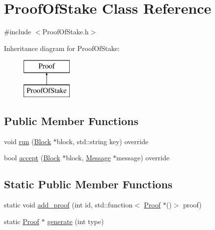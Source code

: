 \hypertarget{classProofOfStake}{}\section{Proof\+Of\+Stake Class Reference}
\label{classProofOfStake}


{\ttfamily \#include $<$Proof\+Of\+Stake.\+h$>$}

Inheritance diagram for Proof\+Of\+Stake\+:\begin{figure}[H]
\begin{center}
\leavevmode
\includegraphics[height=2.000000cm]{classProofOfStake}
\end{center}
\end{figure}
\subsection*{Public Member Functions}
\begin{DoxyCompactItemize}
\item 
void \mbox{\hyperlink{classProofOfStake_aed9baba95df4aba7e8bd0a3e70c44945}{run}} (\mbox{\hyperlink{classBlock}{Block}} $\ast$block, std\+::string key) override
\item 
bool \mbox{\hyperlink{classProofOfStake_a7c5939106f9dcb8bc9612a5974a43c88}{accept}} (\mbox{\hyperlink{classBlock}{Block}} $\ast$block, \mbox{\hyperlink{classMessage}{Message}} $\ast$message) override
\end{DoxyCompactItemize}
\subsection*{Static Public Member Functions}
\begin{DoxyCompactItemize}
\item 
static void \mbox{\hyperlink{classProof_a71874539fdbcc93c15594b889c95225b}{add\+\_\+proof}} (int id, std\+::function$<$ \mbox{\hyperlink{classProof}{Proof}} $\ast$()$>$ proof)
\item 
static \mbox{\hyperlink{classProof}{Proof}} $\ast$ \mbox{\hyperlink{classProof_a267f0f4587babb59884b5f280e2d54c8}{generate}} (int type)
\end{DoxyCompactItemize}
